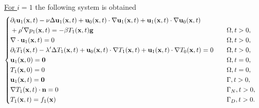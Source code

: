 \underline{For $i=1$} the following system is obtained
\begin{equation} 
\left\lbrace
\begin{aligned}
& \partial_t \mathbf{u}_1(\mathbf{x},t)-\nu\Delta \mathbf{u}_1(\mathbf{x},t)+\mathbf{u}_0(\mathbf{x},t)\cdot\nabla \mathbf{u}_1(\mathbf{x},t)+{\mathbf u}_1(\mathbf{x},t)\cdot\nabla {\mathbf u}_0(\mathbf{x},t)\\
&+\rho'\nabla p_1(\mathbf{x},t)=-\beta T_1(\mathbf{x},t)\mathbf{g} && \quad \Omega,t>0,\\
& \nabla \cdot \mathbf{u}_1(\mathbf{x},t)=0 && \quad \Omega,t>0,\\
 &\partial_t T_1(\mathbf{x},t)-\lambda'\Delta T_1(\mathbf{x},t)+\mathbf{u}_0(\mathbf{x},t)\cdot\nabla T_1(\mathbf{x},t)+\mathbf{u}_1(\mathbf{x},t)\cdot\nabla T_0(\mathbf{x},t)=0 && \quad \Omega,t>0,\\
  & \mathbf{u}_1(\mathbf{x}, 0)= \mathbf{0} && \quad \Omega,t=0,\\
  & T_1(\mathbf{x}, 0)= 0 && \quad \Omega,t=0,\\
 & \mathbf{u}_1(\mathbf{x},t)=\mathbf{0} && \quad \Gamma,t>0,\\
 & \nabla T_1(\mathbf{x},t)\cdot \mathbf{n}=0 && \quad \Gamma_N,t>0,\\
 &T_1(\mathbf{x},t) =\textcolor{black}{ f_1(\mathbf{x})} && \quad \Gamma_D,t>0.
\end{aligned}
\right.
\label{syst_NS_T_coupled_sens1}
\end{equation}


